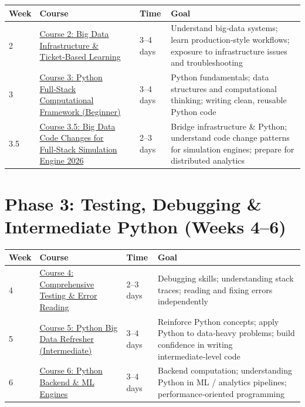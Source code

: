 \documentclass[12pt]{article}
\begin{document}
\begin{tabularx}{\textwidth}{|X|p{3cm}|p{3cm}|X|}
	\hline
	\textbf{Week} & \textbf{Course} & \textbf{Time} & \textbf{Goal} \\
	\hline
	2 & \href{https://www.udemy.com/course/big-data-infra-admin-101-ticket-based-learning/}{Course 2: Big Data Infrastructure \& Ticket‑Based Learning} & 3–4 days & Understand big‑data systems; learn production‑style workflows; exposure to infrastructure issues and troubleshooting \\
	\hline
	3 & \href{https://www.udemy.com/course/python-full-stack-computational-framework-for-begineers-101/}{Course 3: Python Full‑Stack Computational Framework (Beginner)} & 3–4 days & Python fundamentals; data structures and computational thinking; writing clean, reusable Python code \\
	\hline
	3.5 & \href{https://www.udemy.com/course/big-data-code-changes-for-full-stack-simulation-engine-2026/}{Course 3.5: Big Data Code Changes for Full‑Stack Simulation Engine 2026} & 2–3 days & Bridge infrastructure \& Python; understand code change patterns for simulation engines; prepare for distributed analytics \\
	\hline
\end{tabularx}
	
	\vspace{0.3cm}
	
	\section*{ Phase 3: Testing, Debugging \& Intermediate Python (Weeks 4–6)}
	
	\begin{tabularx}{\textwidth}{|X|p{3cm}|p{3cm}|X|}
		\hline
		\textbf{Week} & \textbf{Course} & \textbf{Time} & \textbf{Goal} \\
		\hline
		4 & \href{https://www.udemy.com/course/full-spectrum-comprehensive-testing-error-reading-101/}{Course 4: Comprehensive Testing \& Error Reading} & 2–3 days & Debugging skills; understanding stack traces; reading and fixing errors independently \\
		\hline
		5 & \href{https://www.udemy.com/course/refresher-python-big-data-intermediate-quiz-based-course-102/}{Course 5: Python Big Data Refresher (Intermediate)} & 3–4 days & Reinforce Python concepts; apply Python to data‑heavy problems; build confidence in writing intermediate‑level code \\
		\hline
		6 & \href{https://www.udemy.com/course/python-full-stack-and-backend-engines-for-mc-ml-engines-102/}{Course 6: Python Backend \& ML Engines} & 3–4 days & Backend computation; understanding Python in ML / analytics pipelines; performance‑oriented programming \\
		\hline
	\end{tabularx}
	
\end{document}
